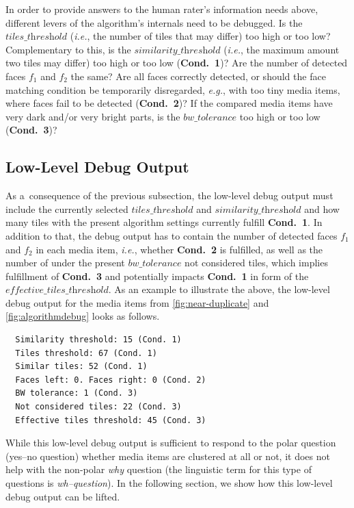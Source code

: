 \documentclass{article}
\begin{document}
In order to provide answers to the human rater's information needs above,
different levers of the algorithm's internals need to be debugged.
Is the $\textit{tiles\_threshold}$
(\emph{i.e.}, the number of tiles that may differ)
too high or too low?
Complementary to this, is the $\textit{similarity\_threshold}$
(\emph{i.e.}, the maximum amount two tiles may differ)
too high or too low (\textbf{Cond.~1})?
Are the number of detected faces $f_1$ and $f_2$ the same?
Are all faces correctly detected,
or should the face matching condition be temporarily disregarded,
\emph{e.g.}, with too tiny media items,
where faces fail to be detected (\textbf{Cond.~2})?
If the compared media items have very dark and/or very bright parts,
is the $\textit{bw\_tolerance}$ too high or too low (\textbf{Cond.~3})?

\subsection{Low-Level Debug Output}
\label{sec:low-level-debug-output}

As a~consequence of the previous subsection,
the low-level debug output must include
the currently selected $\textit{tiles\_threshold}$ and
$\textit{similarity\_threshold}$ and how many tiles
with the present algorithm settings currently fulfill \textbf{Cond.~1}.
In addition to that, the debug output has to contain
the number of detected faces $f_1$ and $f_2$
in each media item, \emph{i.e.}, whether \textbf{Cond.~2} is fulfilled,
as well as the number of under the present $\textit{bw\_tolerance}$
not considered tiles, which implies fulfillment of \textbf{Cond.~3}
and potentially impacts \textbf{Cond.~1}
in form of the $\textit{effective\_tiles\_threshold}$.
As an example to illustrate the above,
the low-level debug output for the media items
from \autoref{fig:near-duplicate} and
\autoref{fig:algorithmdebug} looks as follows.

\begin{verbatim}
  Similarity threshold: 15 (Cond. 1)
  Tiles threshold: 67 (Cond. 1)
  Similar tiles: 52 (Cond. 1)
  Faces left: 0. Faces right: 0 (Cond. 2)
  BW tolerance: 1 (Cond. 3)
  Not considered tiles: 22 (Cond. 3)
  Effective tiles threshold: 45 (Cond. 3)
\end{verbatim}

While this low-level debug output is sufficient to respond to the polar question
(yes--no question) whether media items are clustered at all or not,
it does not help with the non-polar \emph{why} question
(the linguistic term for this type of questions is \emph{wh--question}).
In the following section, we show how this low-level debug output can be lifted.
\end{document}
